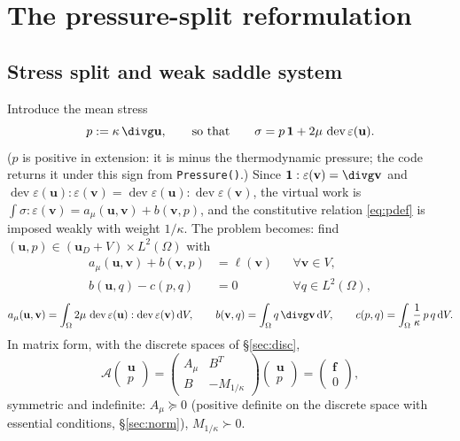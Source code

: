 \documentclass[11pt]{article}
\numberwithin{equation}{section}
\theoremstyle{remark}
\newcommand{\eps}{\varepsilon}
\newcommand{\dV}{\,\mathrm{d}V}
\newcommand{\dev}{\operatorname{dev}}
\newcommand{\vu}{\mathbf{u}}
\newcommand{\vv}{\mathbf{v}}
\newcommand{\vf}{\mathbf{f}}
\newcommand{\one}{\mathbf{1}}
\newcommand{\Amu}{A_{\mu}}
\newcommand{\Mk}{M_{1/\kappa}}
\newcommand{\code}[1]{\texttt{#1}}
\begin{document}
\section{The pressure-split reformulation}
\label{sec:split}

\subsection{Stress split and weak saddle system}

Introduce the mean stress
\begin{equation}
  p := \kappa\,\divg\vu ,
  \qquad\text{so that}\qquad
  \sigma = p\,\one + 2\mu\,\dev\eps(\vu).
  \label{eq:pdef}
\end{equation}
($p$ is positive in extension: it is minus the thermodynamic pressure; the
code returns it under this sign from \code{Pressure()}.) Since $\one :
\eps(\vv) = \divg\vv$ and $\dev\eps(\vu):\eps(\vv) =
\dev\eps(\vu):\dev\eps(\vv)$, the virtual work is
$\int\sigma:\eps(\vv) = a_\mu(\vu,\vv) + b(\vv,p)$, and the constitutive
relation \eqref{eq:pdef} is imposed weakly with weight $1/\kappa$. The
problem becomes: find $(\vu,p)\in(\vu_D + V)\times L^2(\Omega)$ with
\begin{equation}
\begin{aligned}
  a_\mu(\vu,\vv) + b(\vv,p) &= \ell(\vv) && \forall\vv\in V,\\
  b(\vu,q) - c(p,q) &= 0 && \forall q\in L^2(\Omega),
\end{aligned}
\label{eq:saddle}
\end{equation}
\begin{equation}
  a_\mu(\vu,\vv) = \int_\Omega 2\mu\,\dev\eps(\vu):\dev\eps(\vv)\dV,
  \qquad
  b(\vv,q) = \int_\Omega q\,\divg\vv\dV,
  \qquad
  c(p,q) = \int_\Omega \frac{1}{\kappa}\,p\,q\dV .
  \label{eq:forms}
\end{equation}
In matrix form, with the discrete spaces of \S\ref{sec:disc},
\begin{equation}
  \mathcal A
  \begin{pmatrix} \vu \\ p \end{pmatrix}
  =
  \begin{pmatrix} \Amu & B^T \\ B & -\Mk \end{pmatrix}
  \begin{pmatrix} \vu \\ p \end{pmatrix}
  =
  \begin{pmatrix} \vf \\ 0 \end{pmatrix},
  \label{eq:block}
\end{equation}
symmetric and indefinite: $\Amu\succeq0$ (positive definite on the
discrete space with essential conditions, \S\ref{sec:norm}), $\Mk\succ0$.
\end{document}
